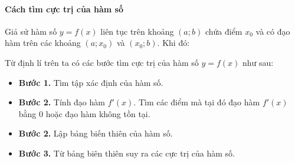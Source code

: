    \paragraph{Cách tìm cực trị của hàm số}
    \begin{dl}
        Giả sử hàm số $y=f(x)$ liên tục trên khoảng $(a; b)$ chứa điểm $x_0$ và có đạo hàm trên các khoảng $\left(a; x_0\right)$ và $\left(x_0; b\right)$. Khi đó:
    \begin{center}
    \hspace*{1.5cm}
\end{center}
    \end{dl}
\begin{note}
Từ định lí trên ta có các bước tìm cực trị của hàm số $y=f(x)$ như sau:
\begin{itemize}
\item {\bf Bước 1.} Tìm tập xác định của hàm số.
\item {\bf Bước 2.} Tính đạo hàm $f'(x)$. Tìm các điểm mà tại đó đạo hàm $f'(x)$ bằng $0$ hoặc đạo hàm không tồn tại.
\item {\bf Bước 2.} Lập bảng biến thiên của hàm số.
\item {\bf Bước 3.} Từ bảng biên thiên suy ra các cực trị của hàm số.
\end{itemize}
\end{note}
